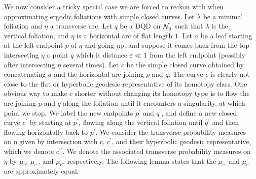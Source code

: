\documentclass[12pt, reqno]{amsart}
\begin{document}
We now consider a tricky special case we are forced to reckon with when approximating ergodic foliations with simple closed curves.
Let $\lambda$ be a minimal foliation and $\eta$ a transverse arc.
Let $q$ be a DQD on $\mathcal{N}_g$ such that $\lambda$ is the vertical foliation, and $\eta$ is a horizontal arc of flat length $1$.
Let $a$ be a leaf starting at the left endpoint $p$ of $\eta$ and going up, and suppose it comes back from the top intersecting $\eta$ a point $q$ which is distance $\varepsilon \ll 1$ from the left endpoint (possibly after intersecting $\eta$ several times).
Let $c$ be the simple closed curve obtained by concatenating $a$ and the horizontal arc joining $p$ and $q$.
The curve $c$ is clearly not close to the flat or hyperbolic geodesic representative of its homotopy class.
One obvious way to make $c$ shorter without changing its homotopy type is to flow the arc joining $p$ and $q$ along the foliation until it encounters a singularity, at which point we stop.
We label the new endpoints $p^{\prime}$ and $q^{\prime}$, and define a new closed curve $c^{\prime}$ by starting at $p^{\prime}$, flowing along the vertical foliation until $q^{\prime}$ and then flowing horizontally back to $p^{\prime}$.
We consider the transverse probability measures on $\eta$ given by intersection with $c$, $c^{\prime}$, and their hyperbolic geodesic representative, which we denote $c^{\prime \prime}$.
We denote the associated transverse probability measures on $\eta$ by $\mu_c$, $\mu_{c^{\prime}}$, and $\mu_{c^{\prime \prime}}$ respectively.
The following lemma states that the $\mu_{c^{\prime}}$ and $\mu_{c^{\prime \prime}}$ are approximately equal.
\end{document}
